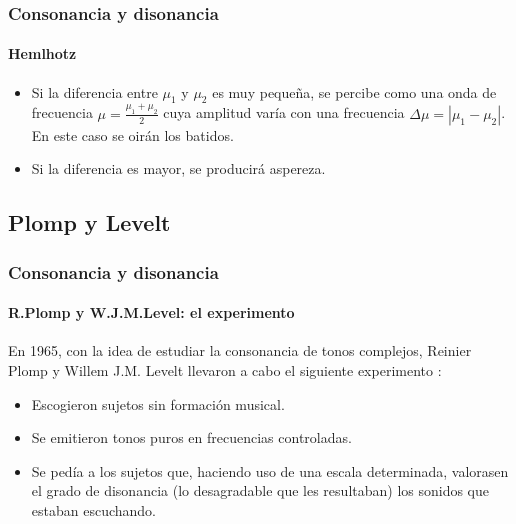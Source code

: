 \documentclass[12 pt]{beamer}
\begin{document}
\begin{frame}{11}
    \frametitle{Consonancia y disonancia}
    
    \framesubtitle{Hemlhotz}
     
    \begin{itemize}
        \item Si la diferencia entre $\mu_1$ y $\mu_2$ es muy pequeña, se percibe como una onda de frecuencia $\mu = \frac{\mu_1 + \mu_2}{2}$ cuya amplitud varía con una frecuencia $\Delta \mu = |\mu_1 - \mu_2|$. En este caso se oirán los batidos.
        \item Si la diferencia es mayor, se producirá aspereza.
    \end{itemize}
    
\end{frame}

\subsection{Plomp y Levelt}

\begin{frame}{12}
    \frametitle{Consonancia y disonancia}
    
    \framesubtitle{R.Plomp y W.J.M.Level: el experimento}
    
    En 1965, con la idea de estudiar la consonancia de tonos complejos, Reinier Plomp y Willem J.M. Levelt llevaron a cabo el siguiente experimento \cite{PL}:
    
    \begin{itemize}
        \item Escogieron sujetos sin formación musical.
        \item Se emitieron tonos puros en frecuencias controladas.
        \item Se pedía a los sujetos que, haciendo uso de una escala determinada, valorasen el grado de disonancia (lo desagradable que les resultaban) los sonidos que estaban escuchando.
    \end{itemize}
    
    
\end{frame}
\end{document}
